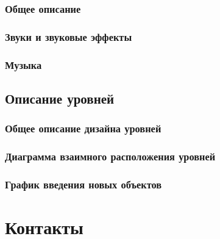 \documentclass{article}
\begin{document}
\subsubsection{Общее описание}
\subsubsection{Звуки и звуковые эффекты}
\subsubsection{Музыка}
\subsection{Описание уровней}
\subsubsection{Общее описание дизайна уровней}
\subsubsection{Диаграмма взаимного расположения уровней}
\subsubsection{ График введения новых объектов}
\section{Контакты}


\end{document}

